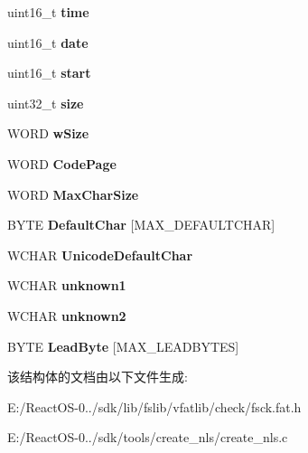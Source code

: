 \begin{DoxyCompactItemize}
uint16\+\_\+t {\bfseries time}
\item 
\mbox{\label{struct____attribute_____a1798e018bbcbd3e41ed3585523bd740c}} 
uint16\+\_\+t {\bfseries date}
\item 
\mbox{\label{struct____attribute_____a5c25969e13205867fb9788611f3a4c4f}} 
uint16\+\_\+t {\bfseries start}
\item 
\mbox{\label{struct____attribute_____a04032b2782f3c2f600024b42bf2478f4}} 
uint32\+\_\+t {\bfseries size}
\item 
\mbox{\label{struct____attribute_____adf8873c04988ec8139cd182237453ead}} 
W\+O\+RD {\bfseries w\+Size}
\item 
\mbox{\label{struct____attribute_____a0e8bb631d55302f3700cc9ccc3df0d2f}} 
W\+O\+RD {\bfseries Code\+Page}
\item 
\mbox{\label{struct____attribute_____aa19529162024f24f9e9750e9d0163bc1}} 
W\+O\+RD {\bfseries Max\+Char\+Size}
\item 
\mbox{\label{struct____attribute_____a36e80f85dac04b9093a1a8541b220944}} 
B\+Y\+TE {\bfseries Default\+Char} \mbox{[}M\+A\+X\+\_\+\+D\+E\+F\+A\+U\+L\+T\+C\+H\+AR\mbox{]}
\item 
\mbox{\label{struct____attribute_____a8594d89ab88760acc7664afd9ae1f851}} 
W\+C\+H\+AR {\bfseries Unicode\+Default\+Char}
\item 
\mbox{\label{struct____attribute_____a36ebdb1fb4a770153f0e14904a2d2636}} 
W\+C\+H\+AR {\bfseries unknown1}
\item 
\mbox{\label{struct____attribute_____a4024a46578bd93f07d8804596c020426}} 
W\+C\+H\+AR {\bfseries unknown2}
\item 
\mbox{\label{struct____attribute_____af76d83324d8b24e44cc7b476a5b7e9cd}} 
B\+Y\+TE {\bfseries Lead\+Byte} \mbox{[}M\+A\+X\+\_\+\+L\+E\+A\+D\+B\+Y\+T\+ES\mbox{]}
\end{DoxyCompactItemize}


该结构体的文档由以下文件生成\+:\begin{DoxyCompactItemize}
\item 
E\+:/\+React\+O\+S-\/0../sdk/lib/fslib/vfatlib/check/fsck.\+fat.\+h\item 
E\+:/\+React\+O\+S-\/0../sdk/tools/create\+\_\+nls/create\+\_\+nls.\+c\end{DoxyCompactItemize}
